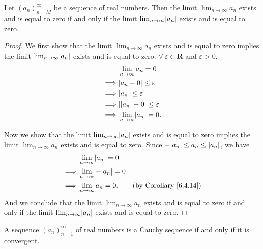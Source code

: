 \begin{corollary}\label{6.4.17}
    Let \((a_n)_{n = M}^\infty\) be a sequence of real numbers.
    Then the limit \(\lim_{n \to \infty} a_n\) exists and is equal to zero if and only if the limit \(\lim_{n \to \infty} \abs*{a_n}\) exists and is equal to zero.
\end{corollary}

\begin{proof}
    We first show that the limit \(\lim_{n \to \infty} a_n\) exists and is equal to zero implies the limit \(\lim_{n \to \infty} \abs*{a_n}\) exists and is equal to zero.
    \(\forall\ \varepsilon \in \mathbf{R}\) and \(\varepsilon > 0\),
    \begin{align*}
                 & \lim_{n \to \infty} a_n = 0            \\
        \implies & \abs*{a_n - 0} \leq \varepsilon        \\
        \implies & \abs*{a_n} \leq \varepsilon            \\
        \implies & \abs*{\abs*{a_n} - 0} \leq \varepsilon \\
        \implies & \lim_{n \to \infty} \abs*{a_n} = 0.
    \end{align*}

    Now we show that the limit \(\lim_{n \to \infty} \abs*{a_n}\) exists and is equal to zero implies the limit \(\lim_{n \to \infty} a_n\) exists and is equal to zero.
    Since \(-\abs*{a_n} \leq a_n \leq \abs*{a_n}\), we have
    \begin{align*}
                 & \lim_{n \to \infty} \abs*{a_n} = 0                                       \\
        \implies & \lim_{n \to \infty} -\abs*{a_n} = 0                                      \\
        \implies & \lim_{n \to \infty} a_n = 0.        & \text{(by Corollary \ref{6.4.14})}
    \end{align*}
    And we conclude that the limit \(\lim_{n \to \infty} a_n\) exists and is equal to zero if and only if the limit \(\lim_{n \to \infty} \abs*{a_n}\) exists and is equal to zero.
\end{proof}

\begin{theorem}\label{6.4.18}
    A sequence \((a_n)_{n = 1}^\infty\) of real numbers is a Cauchy sequence if and only if it is convergent.
\end{theorem}

